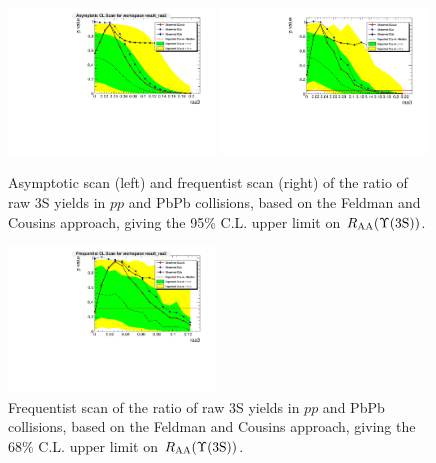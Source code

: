 % 

\begin{figure}[h]
  \begin{centering}       
    \includegraphics[width=0.49\textwidth]{Chapters/aUpsilon/asymptotic_x3raw_simple.pdf}
    \includegraphics[width=0.49\textwidth]{Chapters/aUpsilon/frequentist_x3raw_simple.pdf}
    \caption{Asymptotic scan (left) and frequentist scan (right) of the ratio of raw 3S yields in  $pp$ and PbPb collisions, based on the Feldman and 
      Cousins approach, giving the 95\% C.L. upper limit on $R_{\rm AA}(\Upsilon\mathrm{(3S)})$.}
    \label{fig:3SUL} 
  \end{centering}
\end{figure}

\begin{figure}[h]
  \begin{centering}       
    \includegraphics[width=0.49\textwidth]{Chapters/aUpsilon/frequentist_x3raw_simple_68.pdf}
    \caption{Frequentist scan of the ratio of raw 3S yields in  $pp$ and PbPb collisions, based on the Feldman and Cousins approach, giving the 68\% C.L. upper limit on $R_{\rm AA}(\Upsilon\mathrm{(3S)})$.}
    \label{fig:3SUL_68} 
  \end{centering}
\end{figure}


